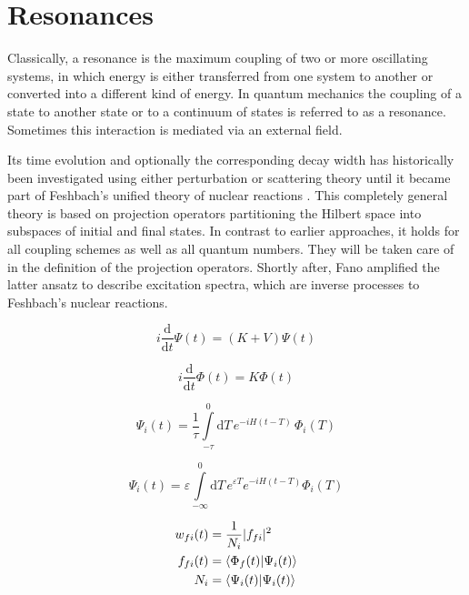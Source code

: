 \section{Resonances}

Classically, a resonance is the maximum coupling of two or more
oscillating systems, in which energy is either transferred from 
one system to another or converted into a different kind of energy.
In quantum mechanics the coupling of a state to another state or to
a continuum of states is referred to as a resonance. Sometimes this
interaction is mediated via an external field.

Its time evolution and optionally the corresponding decay width has historically
been investigated using either perturbation \cite{} or scattering
theory \cite{} until it became part of Feshbach's unified theory of
nuclear reactions \cite{Feshbach58,Feshbach62}. This completely general theory
is based on projection operators partitioning the Hilbert space into subspaces of
initial and final states.
In contrast to earlier approaches, it holds for all coupling schemes as well as
all quantum numbers. They will be taken care of in the definition of the
projection operators.
Shortly after,
Fano amplified the latter ansatz to describe excitation spectra, which
are inverse processes to Feshbach's nuclear reactions.\cite{Fano61}


\begin{equation}
  i \frac{\mathrm{d}}{\mathrm{d}t} \Psi(t) = (K + V) \Psi(t)
\end{equation}

\begin{equation}
  i \frac{\mathrm{d}}{\mathrm{d}t} \Phi(t) = K \Phi(t)
\end{equation}

\begin{equation}
  \Psi_i(t) = \frac 1\tau \int\limits_{-\tau}^0 \mathrm{d}T \,
              e^{-iH(t-T)} \, \Phi_i(T)
\end{equation}

\begin{equation}
  \Psi_i(t) = \varepsilon \int\limits_{-\infty}^0 \mathrm{d}T \,
              e^{\varepsilon T} e^{-iH(t-T)} \Phi_i(T)
\end{equation}

\begin{align}
  w_{fi}(t) &= \frac 1{N_i} |f_{fi}|^2 \\
  f_{fi}(t) &= \braket{\Phi_f(t)|\Psi_i(t)}\\
  N_i       &= \braket{\Psi_i(t)|\Psi_i(t)}
\end{align}

